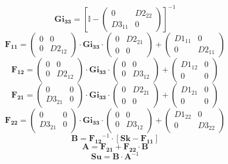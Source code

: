 \[ \mathbf{Gi_{33}} = \left[\mathbb{I} -\left(\begin{smallmatrix} 0 &
D2_{22} \\ D3_{11} & 0 \end{smallmatrix}\right)\right]^{-1} \]
\[ \mathbf{F_{11}} = \left(\begin{smallmatrix} 0 & 0 \\ 0 & D2_{12}
\end{smallmatrix}\right) \cdot\mathbf{Gi_{33}}\cdot
\left(\begin{smallmatrix} 0 & D2_{21} \\ 0 & 0
\end{smallmatrix}\right) + \left(\begin{smallmatrix} D1_{11} & 0 \\ 0
& D2_{11} \end{smallmatrix}\right) \]
\[ \mathbf{F_{12}} = \left(\begin{smallmatrix} 0 & 0 \\ 0 & D2_{12}
\end{smallmatrix}\right) \cdot\mathbf{Gi_{33}}\cdot
\left(\begin{smallmatrix} 0 & 0 \\ 0 & D3_{12}
\end{smallmatrix}\right) + \left(\begin{smallmatrix} D1_{12} & 0 \\ 0
& 0 \end{smallmatrix}\right) \]
\[ \mathbf{F_{21}} = \left(\begin{smallmatrix} 0 & 0 \\ D3_{21} & 0
\end{smallmatrix}\right) \cdot\mathbf{Gi_{33}}\cdot
\left(\begin{smallmatrix} 0 & D2_{21} \\ 0 & 0
\end{smallmatrix}\right) + \left(\begin{smallmatrix} D1_{21} & 0 \\ 0
& 0 \end{smallmatrix}\right) \]
\[ \mathbf{F_{22}} = \left(\begin{smallmatrix} 0 & 0 \\ D3_{21} & 0
\end{smallmatrix}\right) \cdot\mathbf{Gi_{33}}\cdot
\left(\begin{smallmatrix} 0 & 0 \\ 0 & D3_{12}
\end{smallmatrix}\right) + \left(\begin{smallmatrix} D1_{22} & 0 \\ 0
& D3_{22} \end{smallmatrix}\right) \]
\[ \mathbf{B}=\mathbf{F_{12}}^{-1}\cdot\left[ \mathbf{Sk} -
\mathbf{F_{11}} \right]  \]
\[ \mathbf{A}=\mathbf{F_{21}}+ \mathbf{F_{22}}\cdot\mathbf{B} \]
\[ \mathbf{Su} = \mathbf{B} \cdot \mathbf{A}^{-1} \]
